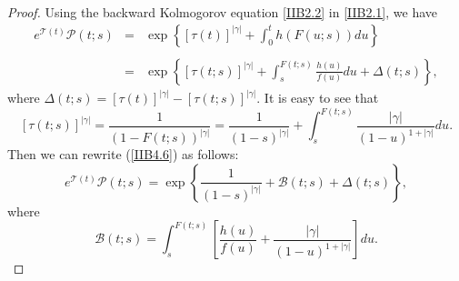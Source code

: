\documentclass[10pt,reqno]{amsart}
\theoremstyle{definition}
\numberwithin{equation}{section}
\begin{document}
\begin{proof}
    Using the backward Kolmogorov equation {\eqref{IIB2.2}} in {\eqref{IIB2.1}}, we have
\begin{eqnarray}                              \label{IIB4.6}
    {{{e}^{\mathcal{T}(t)}}\mathcal{P}(t;s)}
& = & \exp\left\{{{\left[\tau(t)\right]}^{|\gamma|}}+\int_{0}^{t}{h\left(F(u;s)\right)du}\right\} \nonumber\\
\ \nonumber\\
& = & \exp \left\{{{\left[\tau(t;s)\right]}^{|\gamma|}}+\int_{s}^{F(t;s)}{\frac{h(u)}{f(u)}du}+\Delta(t;s)\right\},
\end{eqnarray}
    where $\Delta(t;s)={{[\tau(t)]}^{|\gamma|}}-{{[\tau(t;s)]}^{|\gamma|}}$. It is easy to see that
\[
    {{\left[\tau(t;s)\right]}^{|\gamma|}}=\frac{1}{{\left( 1-F(t;s) \right)}^{|\gamma|}}
    =\frac{1}{{(1-s)}^{|\gamma|}}+\int_{s}^{F(t;s)}{\frac{|\gamma|}{{(1-u)}^{1+|\gamma|}}du}.
\]
    Then we can rewrite {(\ref{IIB4.6})} as follows:
\begin{equation}                \label{IIB4.7}
    {{e}^{\mathcal{T}(t)}}\mathcal{P}(t;s)=\exp\left\{\frac{1}{{(1-s)}^{|\gamma|}}+\mathcal{B}(t;s)+\Delta (t;s)\right\},
\end{equation}
    where
\[
    \mathcal{B}(t;s)=\int_{s}^{F(t;s)}{\left[\frac{h(u)}{f(u)}+\frac{|\gamma|}{{(1-u)}^{1+|\gamma|}}\right]du}.
\]


\end{proof}
\end{document}
